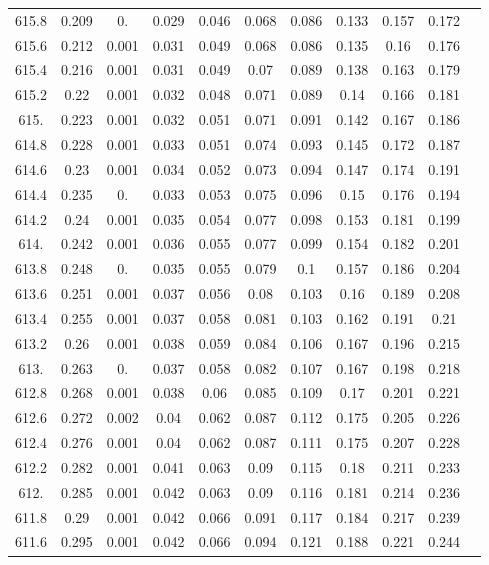 \documentclass[12pt]{ctexart}
\numberwithin{equation}{section}
\begin{document}
\begin{longtable}{ccccccccccc}
615.8	&	0.209	&	0.	&	0.029	&	0.046	&	0.068	&	0.086	&	0.133	&	0.157	&	0.172	\\
615.6	&	0.212	&	0.001	&	0.031	&	0.049	&	0.068	&	0.086	&	0.135	&	0.16	&	0.176	\\
615.4	&	0.216	&	0.001	&	0.031	&	0.049	&	0.07	&	0.089	&	0.138	&	0.163	&	0.179	\\
615.2	&	0.22	&	0.001	&	0.032	&	0.048	&	0.071	&	0.089	&	0.14	&	0.166	&	0.181	\\
615.	&	0.223	&	0.001	&	0.032	&	0.051	&	0.071	&	0.091	&	0.142	&	0.167	&	0.186	\\
614.8	&	0.228	&	0.001	&	0.033	&	0.051	&	0.074	&	0.093	&	0.145	&	0.172	&	0.187	\\
614.6	&	0.23	&	0.001	&	0.034	&	0.052	&	0.073	&	0.094	&	0.147	&	0.174	&	0.191	\\
614.4	&	0.235	&	0.	&	0.033	&	0.053	&	0.075	&	0.096	&	0.15	&	0.176	&	0.194	\\
614.2	&	0.24	&	0.001	&	0.035	&	0.054	&	0.077	&	0.098	&	0.153	&	0.181	&	0.199	\\
614.	&	0.242	&	0.001	&	0.036	&	0.055	&	0.077	&	0.099	&	0.154	&	0.182	&	0.201	\\
613.8	&	0.248	&	0.	&	0.035	&	0.055	&	0.079	&	0.1	&	0.157	&	0.186	&	0.204	\\
613.6	&	0.251	&	0.001	&	0.037	&	0.056	&	0.08	&	0.103	&	0.16	&	0.189	&	0.208	\\
613.4	&	0.255	&	0.001	&	0.037	&	0.058	&	0.081	&	0.103	&	0.162	&	0.191	&	0.21	\\
613.2	&	0.26	&	0.001	&	0.038	&	0.059	&	0.084	&	0.106	&	0.167	&	0.196	&	0.215	\\
613.	&	0.263	&	0.	&	0.037	&	0.058	&	0.082	&	0.107	&	0.167	&	0.198	&	0.218	\\
612.8	&	0.268	&	0.001	&	0.038	&	0.06	&	0.085	&	0.109	&	0.17	&	0.201	&	0.221	\\
612.6	&	0.272	&	0.002	&	0.04	&	0.062	&	0.087	&	0.112	&	0.175	&	0.205	&	0.226	\\
612.4	&	0.276	&	0.001	&	0.04	&	0.062	&	0.087	&	0.111	&	0.175	&	0.207	&	0.228	\\
612.2	&	0.282	&	0.001	&	0.041	&	0.063	&	0.09	&	0.115	&	0.18	&	0.211	&	0.233	\\
612.	&	0.285	&	0.001	&	0.042	&	0.063	&	0.09	&	0.116	&	0.181	&	0.214	&	0.236	\\
611.8	&	0.29	&	0.001	&	0.042	&	0.066	&	0.091	&	0.117	&	0.184	&	0.217	&	0.239	\\
611.6	&	0.295	&	0.001	&	0.042	&	0.066	&	0.094	&	0.121	&	0.188	&	0.221	&	0.244	\\

\end{longtable}
\end{document}
